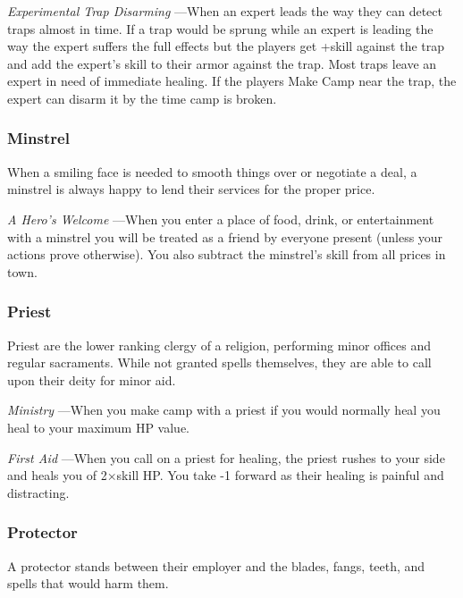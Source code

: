  

{\em Experimental Trap Disarming} —When an expert leads the way they can detect traps almost in time. If a trap would be sprung while an expert is leading the way the expert suffers the full effects but the players get +skill against the trap and add the expert's skill to their armor against the trap. Most traps leave an expert in need of immediate healing. If the players Make Camp near the trap, the expert can disarm it by the time camp is broken.

 
\subsubsection{Minstrel}   
 

When a smiling face is needed to smooth things over or negotiate a deal, a minstrel is always happy to lend their services for the proper price.

 

{\em A Hero's Welcome} —When you enter a place of food, drink, or entertainment with a minstrel you will be treated as a friend by everyone present (unless your actions prove otherwise). You also subtract the minstrel's skill from all prices in town.

 
\subsubsection{Priest}   
 

Priest are the lower ranking clergy of a religion, performing minor offices and regular sacraments. While not granted spells themselves, they are able to call upon their deity for minor aid.

 

{\em Ministry} —When you make camp with a priest if you would normally heal you heal to your maximum HP value.

 

{\em First Aid} —When you call on a priest for healing, the priest rushes to your side and heals you of 2×skill HP. You take -1 forward as their healing is painful and distracting.

 
\subsubsection{Protector}   
 

A protector stands between their employer and the blades, fangs, teeth, and spells that would harm them. 

